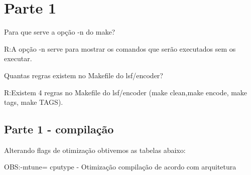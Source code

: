 \documentclass[10pt,a4paper]{article}
\begin{document}
\setlength{\parskip}{0pt}
\setlength{\parsep}{0pt}
\setlength{\headsep}{0pt}
\setlength{\topskip}{0pt}
\setlength{\topmargin}{0pt}
\setlength{\topsep}{0pt}
\setlength{\partopsep}{0pt}


\begin{minipage}{5cm}
  \vspace{2mm}
\end{minipage}

\vspace{-3mm}

\section{Parte 1}
Para que serve a opção -n do make?

R:A opção -n serve para mostrar os comandos que serão executados sem
os executar.

Quantas regras existem no Makefile do lsf/encoder?

R:Existem 4 regras no Makefile do lsf/encoder (make clean,make encode, make tags, make TAGS).

\subsection{Parte 1 - compilação}
Alterando flags de otimização obtivemos as tabelas abaixo:

OBS:-mtune= cpu\underline{}type - Otimização compilação de acordo com arquitetura
\end{document}
